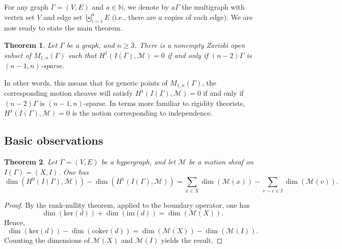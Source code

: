 \documentclass{article}
\newtheorem{theorem}{Theorem}[section]
\theoremstyle{definition}
\theoremstyle{remark}
\begin{document}
For any graph $\Gamma= (V, E)$ and $a \in \mathbb{N}$, we denote by $a \Gamma$ the multigraph with vertex set $V$ and edge set $\biguplus_{i=1}^{a} E$ (i.e., there are $a$ copies of each edge). We are now ready to state the main theorem. 
\begin{theorem}\label{thm: main theorem}
    Let $\Gamma$ be a graph, and $n\geq 3$. There is a nonempty Zariski open subset of $M_{1, n}(\Gamma)$ such that $H^{1}(I(\Gamma), \mathcal{M}) = 0$ if and only if $(n-2)\Gamma$ is $(n-1, n)$-sparse. 
\end{theorem}
In other words, this means that for generic points of $M_{1, n}(\Gamma)$, the corresponding motion sheaves will satisfy $H^{1}(I(\Gamma), \mathcal{M}) = 0$ if and only if $(n-2)\Gamma$ is $(n-1,n)$-sparse. In terms more familiar to rigidity theorists, $H^{1}(I(\Gamma), \mathcal{M})=0$ is the notion corresponding to independence.

\subsection{Basic observations}
\begin{theorem}\label{thm: Maxwell-rule}
Let $\Gamma=(V, E)$ be a hypergraph, and let $\mathcal{M}$ be a motion sheaf on $I(\Gamma)=(X, I)$. One has
\begin{equation*}
\dim(H^{0}(I(\Gamma), \mathcal{M})) - \dim(H^{1}(I(\Gamma),  \mathcal{M}))= \sum_{x\in X} \dim\left(\mathcal{M}(x)\right) - \sum_{v\sim e\in I} \dim(\mathcal{M}(v)).
\end{equation*}
\end{theorem} 
\begin{proof}
By the rank-nullity theorem, applied to the boundary operator, one has
\begin{equation*}
 \dim( \text{ker}(d)) + \dim( \text{im}(d))= \dim(\mathcal{M}(X)).
 \end{equation*}
 Hence, 
 \begin{equation*}
 \dim( \text{ker}(d)) - \dim( \text{coker}(d))= \dim(\mathcal{M}(X)) - \dim(\mathcal{M}(I)).
 \end{equation*}
Counting the dimensions of $\mathcal{M}(X)$ and $\mathcal{M}(I)$ yields the result. 
\end{proof}
\end{document}
